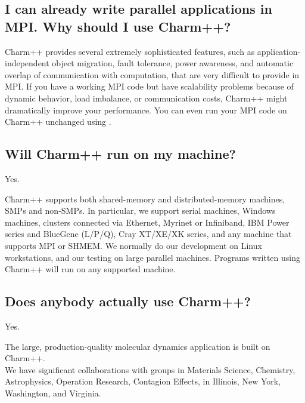 \subsection{I can already write parallel applications in MPI. Why should I use Charm++?}

Charm++ provides several extremely sophisticated features, such as
application-independent object migration, fault tolerance, power
awareness, and automatic overlap of communication with computation,
that are very difficult to provide in MPI.  If you have a working MPI
code but have scalability problems because of dynamic behavior, load
imbalance, or communication costs, Charm++ might dramatically improve
your performance. You can even run your MPI code on Charm++ unchanged
using
.

\subsection{Will Charm++ run on my machine?}

Yes.

Charm++ supports both shared-memory and distributed-memory machines,
SMPs and non-SMPs. In particular, we support serial machines, Windows
machines, clusters connected via Ethernet, Myrinet or Infiniband, IBM
Power series and BlueGene (L/P/Q), Cray XT/XE/XK series, and any machine that
supports MPI or SHMEM. We normally do our development on Linux
workstations, and our testing on large parallel machines. Programs
written using Charm++ will run on any supported machine.


\subsection{Does anybody actually use Charm++?}

Yes.

The large, production-quality molecular dynamics application 
is built on Charm++.\\
We have significant collaborations with groups in Materials Science,
Chemistry, Astrophysics, Operation Research, Contagion Effects, in Illinois, New York, Washington, and Virginia.

